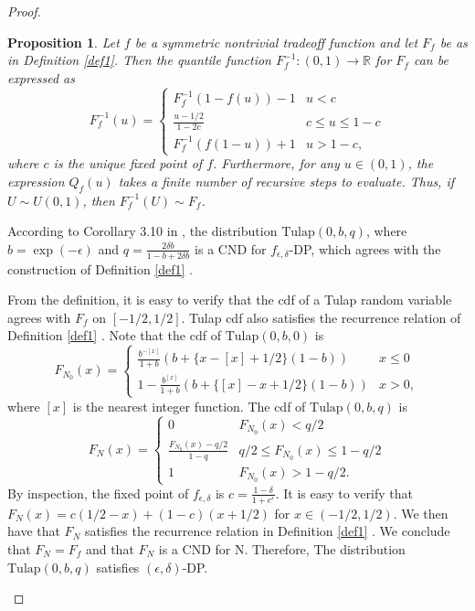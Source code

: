 \documentclass{article}
\newtheorem{prop}{Proposition}
\begin{document}
\begin{proof}
\begin{enumerate}
\begin{prop}\label{prop1}   %
    Let $f$ be a symmetric nontrivial tradeoff function and let $F_f$ be as in Definition \ref{def1}. 
    Then the quantile function $F_f^{-1}:(0,1)\rightarrow \mathbb{R}$ for $F_f$ can be expressed as
    \[F_f^{-1}(u) = \begin{cases}
    F_f^{-1}(1-f(u))-1&u<c\\
    \frac{u-1/2}{1-2c}&c\leq u\leq 1-c\\
    F_f^{-1}(f(1-u))+1&u>1-c,
    \end{cases}\]
    where $c$ is the unique fixed point of $f$. 
    {Furthermore, for any $u\in (0,1)$, the expression $Q_f(u)$ takes a finite number of recursive steps to evaluate. Thus,} 
    if $U\sim U(0,1)$, then $F_f^{-1}(U) \sim F_f$. 
\end{prop}

According to Corollary 3.10 in \cite{awan2023canonical}, 
the distribution $\mathrm{Tulap}(0,b,q)$, where $b=\exp(-\epsilon)$ and $q = \frac{2\delta b}{1-b+2\delta b}$ 
is a CND for $f_{\epsilon,\delta}$-DP, which agrees with the construction of Definition \ref{def1} \parencite{awan2023canonical}. 

From the definition, it is easy to verify that the cdf of a Tulap random variable agrees with $F_f$ on $[-1/2,1/2]$. 
Tulap cdf also satisfies the recurrence relation of Definition \ref{def1} \parencite{awan2023canonical}. 
Note that the cdf of $\mathrm{Tulap}(0,b,0)$ is 
\[F_{N_0}(x) = \begin{cases}
    \frac{b^{-[x]}}{1+b}(b+\{x-[x]+1/2\}(1-b))& x\leq 0\\
    1- \frac{b^{[x]}}{1+b}(b+\{[x]-x+1/2\}(1-b))&x>0,
\end{cases}\]
where $[x]$ is the nearest integer function. 
The cdf of $\mathrm{Tulap}(0,b,q)$ is
\[F_N(x) = \begin{cases}
    0&F_{N_0}(x)<q/2\\
    \frac{F_{N_0}(x)-q/2}{1-q}& q/2\leq F_{N_0}(x)\leq 1-q/2\\
    1&F_{N_0}(x)>1-q/2.
\end{cases}\]
By inspection, the fixed point of $f_{\epsilon,\delta}$ is $c=\frac{1-\delta}{1+e^\epsilon}$. 
It is easy to verify that $F_N(x) = c(1/2-x) + (1-c)(x+1/2)$ for $x\in (-1/2,1/2)$. 
We then have that $F_N$ satisfies the recurrence relation in Definition \ref{def1} \parencite{awan2023canonical}. 
We conclude that $F_N = F_f$ and that $F_N$ is a CND for N. Therefore, The distribution $\mathrm{Tulap}(0,b,q)$ satisfies $(\epsilon, \delta)$-DP.
\end{enumerate}
\end{proof}

\printbibliography
\end{document}
